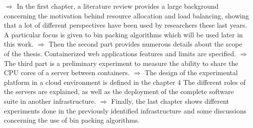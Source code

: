 $\Rightarrow$ In the first chapter, a literature review provides a large
background concerning the motivation behind resource allocation and load
balancing, showing that a lot of different perspectives have been used by
researchers these last years. A particular focus is given to bin packing
algorithms which will be used later in this work. \vspace{5pt} \newline
$\Rightarrow$ Then the second part provides numerous details about the scope of
the thesis.  Containerized web applications features and limits are specified.
\vspace{5pt} \newline $\Rightarrow$ The third part is a preliminary experiment
to measure the ability to share the CPU cores of a server between containers.
\vspace{5pt} \newline $\Rightarrow$ The design of the experimental platform in
a cloud environment is defined in the chapter 4 The different roles of the
servers are explained, as well as the deployment of the complete software suite
in another infrastructure.\vspace{5pt} \newline $\Rightarrow$ Finally, the
last chapter shows different experiments done in the previously identified
infrastructure and some discussions concerning the use of bin packing
algorithms.

 
